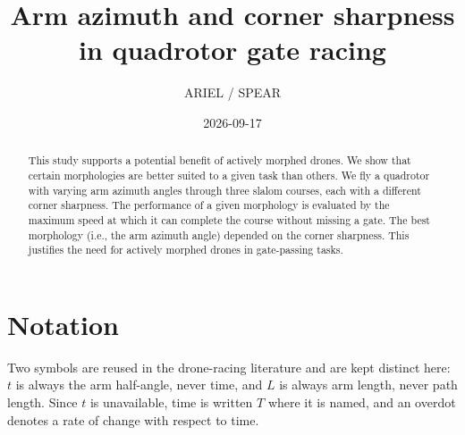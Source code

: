 \documentclass[11pt,a4paper]{article}
\title{Arm azimuth and corner sharpness in quadrotor gate racing}
\author{ARIEL / SPEAR}
\date{2026-09-17} %
\begin{document}
\maketitle

\begin{abstract}
This study supports a potential benefit of actively morphed drones. We show that certain morphologies are better suited to a given task than others. We fly a quadrotor with varying arm azimuth angles through three slalom courses, each with a different corner sharpness. The performance of a given morphology is evaluated by the maximum speed at which it can complete the course without missing a gate. The best morphology (i.e., the arm azimuth angle) depended on the corner sharpness. This justifies the need for actively morphed drones in gate-passing tasks.
\end{abstract}


\section*{Notation}

Two symbols are reused in the drone-racing literature and are kept distinct
here: $t$ is always the arm half-angle, never time, and $L$ is always arm
length, never path length. Since $t$ is unavailable, time is written $T$ where
it is named, and an overdot denotes a rate of change with respect to time.
\end{document}
